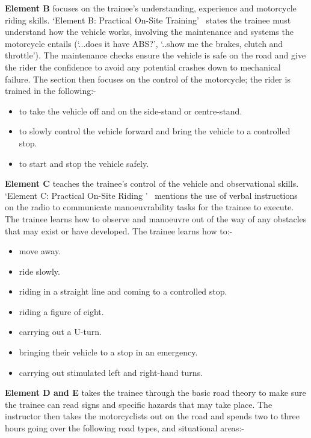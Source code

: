 \documentclass[12pt]{report} %
\begin{document}
		\textbf{Element B} focuses on the trainee's understanding, experience and motorcycle riding skills. `Element B: Practical On-Site Training'~\cite{govuk_compulsory_2016} states the trainee must understand how the vehicle works, involving the maintenance and systems the motorcycle entails (`...does it have ABS?', `..show me the brakes, clutch and throttle'). The maintenance checks ensure the vehicle is safe on the road and give the rider the confidence to avoid any potential crashes down to mechanical failure. The section then focuses on the control of the motorcycle; the rider is trained in the following:-

		\begin{itemize}
			\item to take the vehicle off and on the side-stand or centre-stand.
			\item to slowly control the vehicle forward and bring the vehicle to a controlled stop.
			\item to start and stop the vehicle safely.
		\end{itemize}

		\textbf{Element C} teaches the trainee's control of the vehicle and observational skills. `Element C: Practical On-Site Riding '~\cite {govuk_compulsory_2016-1} mentions the use of verbal instructions on the radio to communicate manoeuvrability tasks for the trainee to execute. The trainee learns how to observe and manoeuvre out of the way of any obstacles that may exist or have developed. The trainee learns how to:-
		
		\begin{itemize}
			\item move away.
			\item ride slowly.
			\item riding in a straight line and coming to a controlled stop.
			\item riding a figure of eight.
			\item carrying out a U-turn.
			\item bringing their vehicle to a stop in an emergency.
			\item carrying out stimulated left and right-hand turns.
		\end{itemize}

		\textbf{Element D and E} takes the trainee through the basic road theory to make sure the trainee can read signs and specific hazards that may take place. The instructor then takes the motorcyclists out on the road and spends two to three hours going over the following road types, and situational areas:-
\end{document}

